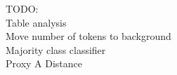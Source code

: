 TODO:\\
Table analysis\\
Move number of tokens to background\\
Majority class classifier\\
Proxy A Distance\\

